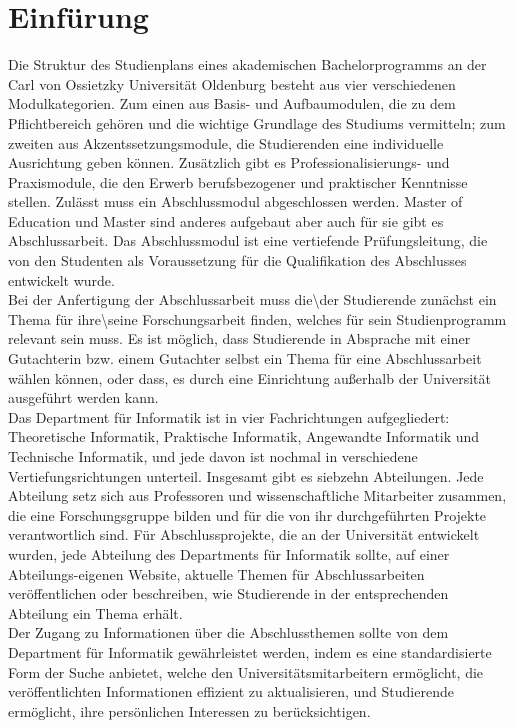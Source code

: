 \section{Einfürung}
Die Struktur des Studienplans eines akademischen Bachelorprogramms an der Carl von Ossietzky Universität Oldenburg besteht aus vier verschiedenen Modulkategorien. Zum einen aus Basis- und Aufbaumodulen, die zu dem Pflichtbereich gehören und die wichtige Grundlage des Studiums vermitteln; zum zweiten aus Akzentssetzungsmodule, die Studierenden eine individuelle Ausrichtung geben können. Zusätzlich gibt es Professionalisierungs- und Praxismodule, die den Erwerb berufsbezogener und praktischer Kenntnisse stellen. Zulässt muss ein Abschlussmodul abgeschlossen werden. Master of Education und Master sind anderes aufgebaut aber auch für sie gibt es Abschlussarbeit.
Das Abschlussmodul ist eine vertiefende Prüfungsleitung, die von den Studenten als Voraussetzung für die Qualifikation des Abschlusses entwickelt wurde\cite{BScInf:2020}.\\

Bei der Anfertigung der Abschlussarbeit muss die\textbackslash der Studierende zunächst ein Thema für ihre\textbackslash seine Forschungsarbeit finden, welches für sein Studienprogramm relevant sein muss. Es ist möglich, dass Studierende in Absprache mit einer Gutachterin bzw. einem Gutachter selbst ein Thema für eine Abschlussarbeit wählen können, oder dass, es durch eine Einrichtung au{\ss}erhalb der Universität ausgeführt werden kann\cite{Boles:2015}.\\

Das Department für Informatik ist in vier Fachrichtungen aufgegliedert: Theoretische Informatik, Praktische Informatik, Angewandte Informatik und Technische Informatik, und jede davon ist nochmal in verschiedene Vertiefungsrichtungen unterteil. Insgesamt gibt es siebzehn Abteilungen\cite{SpeInf:2020}. Jede Abteilung setz sich aus Professoren und wissenschaftliche Mitarbeiter zusammen, die eine Forschungsgruppe bilden und für die von ihr durchgeführten Projekte verantwortlich sind.
Für Abschlussprojekte, die an der Universität entwickelt wurden, jede Abteilung des Departments für Informatik sollte, auf einer Abteilungs-eigenen Website, aktuelle Themen für Abschlussarbeiten veröffentlichen oder beschreiben, wie Studierende in der entsprechenden Abteilung ein Thema erhält\cite{Boles:2015}.\\

Der Zugang zu Informationen über die Abschlussthemen sollte von dem Department für Informatik gewährleistet werden, indem es eine standardisierte Form der Suche anbietet, welche den Universitätsmitarbeitern ermöglicht, die veröffentlichten Informationen effizient zu aktualisieren, und Studierende ermöglicht, ihre persönlichen Interessen zu berücksichtigen.

